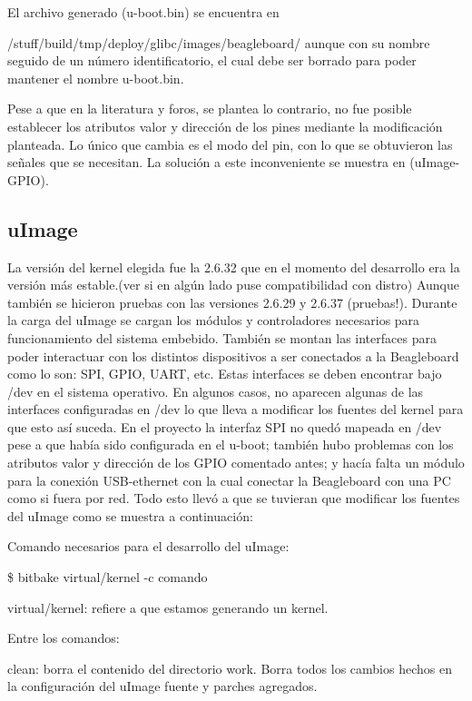 \bigskip
El archivo generado (u-boot.bin) se encuentra en 

/stuff/build/tmp/deploy/glibc/images/beagleboard/ aunque con su nombre seguido de un número identificatorio, el cual debe ser borrado para poder mantener el nombre u-boot.bin.

\bigskip
Pese a que en la literatura y foros, se plantea lo contrario, no fue posible establecer los atributos valor y dirección de los pines mediante la modificación planteada. Lo único que cambia es el modo del pin, con lo que se obtuvieron las señales que se necesitan. La solución a este inconveniente se muestra en (uImage-GPIO).


\subsection{uImage}
La versión del kernel elegida fue la 2.6.32 que en el momento del desarrollo era la versión más estable.(ver si en algún lado puse compatibilidad con distro) Aunque también se hicieron pruebas con las versiones 2.6.29 y 2.6.37 (pruebas!).
Durante la carga del uImage se cargan los módulos y controladores necesarios para funcionamiento del sistema embebido. También se montan las interfaces para poder interactuar con los distintos dispositivos a ser conectados a la Beagleboard como lo son: SPI, GPIO, UART, etc. Estas interfaces se deben encontrar bajo /dev en el sistema operativo. En algunos casos, no aparecen algunas de las interfaces configuradas en /dev lo que lleva a modificar los fuentes del kernel para que esto así suceda. En el proyecto la interfaz SPI no quedó mapeada en /dev pese a que había sido configurada en el u-boot; también hubo problemas con los atributos valor y dirección de los GPIO comentado antes; y hacía falta un módulo para la conexión USB-ethernet con la cual conectar la Beagleboard con una PC como si fuera por red. Todo esto llevó a que se tuvieran que modificar los fuentes del uImage como se muestra a continuación:
 
\bigskip 
Comando necesarios para el desarrollo del uImage:

\bigskip
\centerline{\$ bitbake virtual/kernel -c comando}

\bigskip
virtual/kernel: refiere a que estamos generando un kernel.

\bigskip
Entre los comandos:

\bigskip
clean: borra el contenido del directorio work. Borra todos los cambios hechos en la configuración del uImage fuente y parches agregados.

